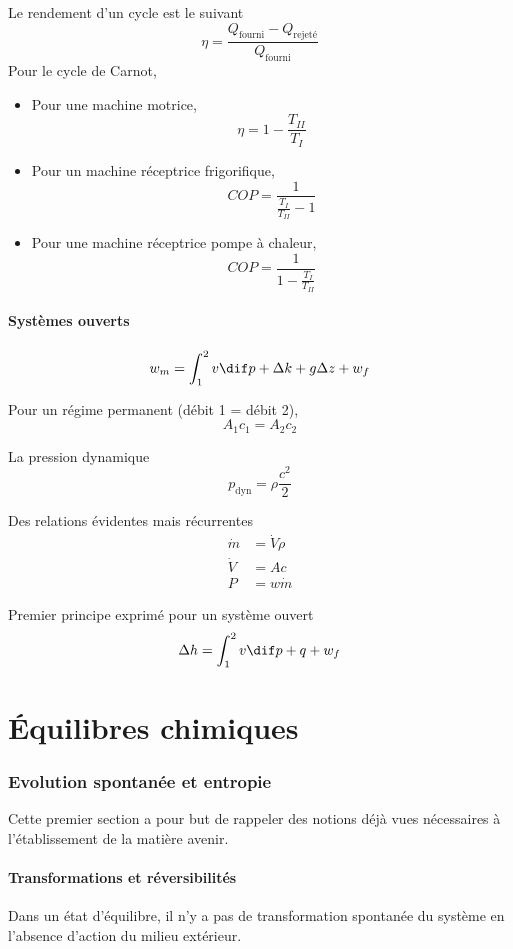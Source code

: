 Le rendement d'un cycle est le suivant
\[ \eta = \frac{Q_\mathrm{fourni} - Q_\mathrm{rejeté}}{Q_\mathrm{fourni}} \]
Pour le cycle de Carnot,
\begin{itemize}
  \item Pour une machine motrice,
    \[ \eta = 1 - \frac{T_{II}}{T_I} \]
  \item Pour un machine réceptrice frigorifique,
    \[ COP = \frac{1}{\frac{T_I}{T_{II}}-1} \]
  \item Pour une machine réceptrice pompe à chaleur,
    \[ COP = \frac{1}{1-\frac{T_I}{T_{II}}} \]
\end{itemize}

\subsection{Systèmes ouverts}
\[ w_m = \int_1^2v\dif p + \Delta k + g\Delta z + w_f \]

Pour un régime permanent (débit 1 = débit 2),
\[ A_1 c_1 = A_2 c_2 \]

La pression dynamique
\[ p_\mathrm{dyn} = \rho \frac{c^2}{2} \]

Des relations évidentes mais récurrentes
\begin{align*}
  \dot{m} & = \dot{V} \rho\\
  \dot{V} & = A c\\
  P & = w \dot{m}
\end{align*}

Premier principe exprimé pour un système ouvert
\[ \Delta h = \int_1^2 v \dif p + q + w_f \]

\part{Équilibres chimiques}
\section{Evolution spontanée et entropie}
Cette premier section a pour but de rappeler des notions déjà vues nécessaires
à l'établissement de la matière avenir.

\subsection{Transformations et réversibilités}
Dans un état d'équilibre, il n'y a pas de transformation spontanée du système
en l'absence d'action du milieu extérieur.

